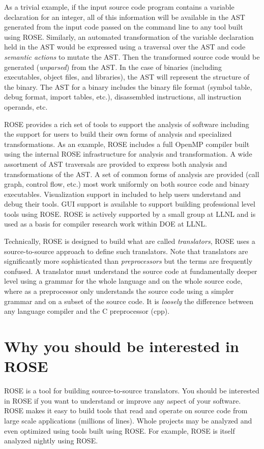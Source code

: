    As a trivial example, if the input source code program contains a variable declaration
for an integer, all of this information will be available in the AST generated from
the input code passed on the command line to any tool built using ROSE.
Similarly, an automated transformation of the variable declaration 
held in the AST would be expressed using a traversal over the AST and
code {\em semantic actions} to mutate the AST. Then the transformed source code would be 
generated ({\em unparsed}) from the AST.  In the case of binaries 
(including executables, object files, and libraries), the AST will 
represent the structure of the binary. The AST for a binary includes the 
binary file format (symbol table, debug format, import tables, etc.), 
disassembled instructions, all instruction operands, etc.

   ROSE provides a rich set of tools to support the analysis of 
software including the support for users to build their own forms
of analysis and specialized transformations. As an example, ROSE includes
a full OpenMP compiler built using the internal ROSE infrastructure 
for analysis and transformation.
A wide assortment of AST traversals are provided
to express both analysis and transformations of the AST. A set of
common forms of analysis are provided (call graph, control flow, etc.)
most work uniformly on both source code and binary executables.
Visualization support in included to help users understand and debug
their tools.  GUI support is available to support building professional
level tools using ROSE. ROSE is actively supported by a small
group at LLNL and is used as a basis for compiler research work within 
DOE at LLNL.

   Technically, ROSE is designed to build what are called {\em translators}, 
ROSE uses a source-to-source approach to define such translators. Note that 
translators are significantly more sophisticated than {\em preprocessors} 
but the terms are frequently confused. A translator must understand the 
source code at fundamentally deeper level using a grammar for the whole language
and on the whole source code, where as a preprocessor only understands the 
source code using a simpler grammar and on a subset of the source code. 
It is {\em loosely} the difference between any language compiler and the 
C preprocessor (cpp).

\section{Why you should be interested in ROSE}
ROSE is a tool for building source-to-source translators.
You should be interested in ROSE if you want to 
understand or improve any aspect of your software. ROSE
makes it easy to build tools that read and operate on source code
from large scale applications (millions of lines).  Whole projects
may be analyzed and even optimized using tools built using ROSE.
For example, ROSE is itself analyzed nightly using ROSE.


